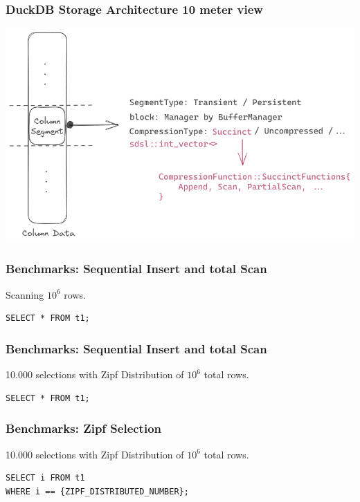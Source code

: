 \documentclass{beamer}
\begin{document}
\begin{frame}
    \frametitle{DuckDB Storage Architecture 10 meter view}
    \includegraphics[width=\framewidth]{figures/excalidraw/duckdb-column-segment-look.png}

\end{frame}


\begin{frame}[fragile]
    \frametitle{Benchmarks: Sequential Insert and total Scan}
Scanning $10^6$ rows.

\begin{lstlisting}[style=SQL]
SELECT * FROM t1;
\end{lstlisting}

    
\end{frame}


\begin{frame}[fragile]
    \frametitle{Benchmarks: Sequential Insert and total Scan}
10.000 selections with Zipf Distribution of $10^6$ total rows.

\begin{lstlisting}[style=SQL]
SELECT * FROM t1;
\end{lstlisting}

    
\end{frame}


\begin{frame}[fragile]
    \frametitle{Benchmarks: Zipf Selection}
10.000 selections with Zipf Distribution of $10^6$ total rows.

\begin{lstlisting}[style=SQL]
SELECT i FROM t1 
WHERE i == {ZIPF_DISTRIBUTED_NUMBER};
\end{lstlisting}

    
\end{frame}
\end{document}
